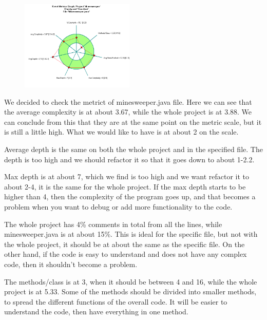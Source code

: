 \documentclass[UKenglish]{article}  %
\begin{document}
\begin{figure}
	\vspace{-8ex}
	\begin{center}
		\includegraphics[width=0.48\textwidth]{kiviat_diagram_minesweeper}
	\end{center}
	\vspace{-20ex}
\end{figure}

We decided to check the metrict of minesweeper.java file. Here we can see that the average complexity is at about 3.67, while the whole project is at 3.88. We can conclude from this that they are at the same point on the metric scale, but it is still a little high. What we would like to have is at about 2 on the scale. 

Average depth is the same on both the whole project and in the specified file. The depth is too high and we should refactor it so that it goes down to about 1-2.2. 

Max depth is at about 7, which we find is too high and we want refactor it to about 2-4, it is the same for the whole project. If the max depth starts to be higher than 4, then the complexity of the program goes up, and that becomes a problem when you want to debug or add more functionality to the code. 

The whole project has 4\% comments in total from all the lines, while minesweeper.java is at about 15\%. This is ideal for the specific file, but not with the whole project, it should be at about the same as the specific file. On the other hand, if the code is easy to understand and does not have any complex code, then it shouldn't become a problem. 

The methods/class is at 3, when it should be between 4 and 16, while the whole project is at 5.33. Some of the methods should be divided into smaller methods, to spread the different functions of the overall code. It will be easier to understand the code, then have everything in one method.
\end{document}
